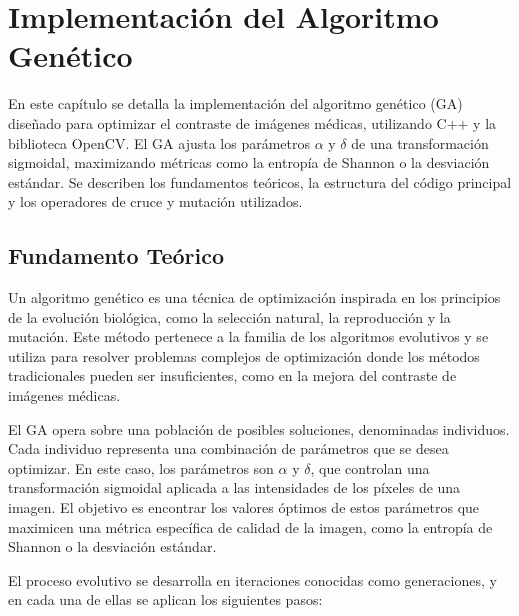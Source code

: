 \chapter{Implementación del Algoritmo Genético}
\label{chap:implementacion}

En este capítulo se detalla la implementación del algoritmo genético (GA) diseñado para optimizar el contraste de imágenes médicas, utilizando C++ y la biblioteca OpenCV. El GA ajusta los parámetros \(\alpha\) y \(\delta\) de una transformación sigmoidal, maximizando métricas como la entropía de Shannon o la desviación estándar. Se describen los fundamentos teóricos, la estructura del código principal y los operadores de cruce y mutación utilizados.

\section{Fundamento Teórico}
\label{sec:fundamento_teorico}

Un algoritmo genético es una técnica de optimización inspirada en los principios de la evolución biológica, como la selección natural, la reproducción y la mutación. Este método pertenece a la familia de los algoritmos evolutivos y se utiliza para resolver problemas complejos de optimización donde los métodos tradicionales pueden ser insuficientes, como en la mejora del contraste de imágenes médicas.

El GA opera sobre una población de posibles soluciones, denominadas individuos. Cada individuo representa una combinación de parámetros que se desea optimizar. En este caso, los parámetros son \(\alpha\) y \(\delta\), que controlan una transformación sigmoidal aplicada a las intensidades de los píxeles de una imagen. El objetivo es encontrar los valores óptimos de estos parámetros que maximicen una métrica específica de calidad de la imagen, como la entropía de Shannon o la desviación estándar.

El proceso evolutivo se desarrolla en iteraciones conocidas como generaciones, y en cada una de ellas se aplican los siguientes pasos:

